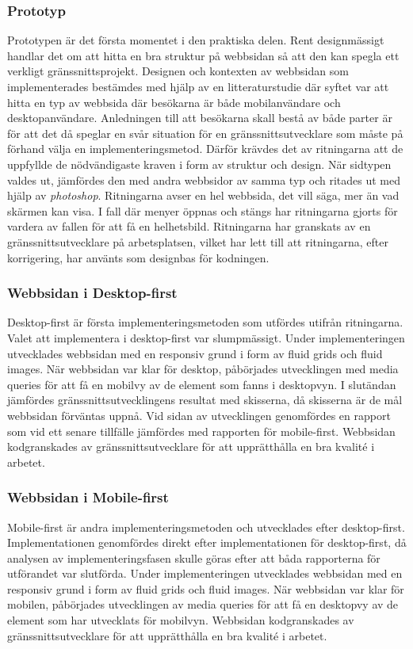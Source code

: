 \documentclass[11pt]{article}
\begin{document}
\subsubsection{Prototyp}
Prototypen är det första momentet i den praktiska delen. Rent designmässigt handlar det om att hitta en bra struktur på webbsidan så att den kan spegla ett verkligt gränssnittsprojekt. Designen och kontexten av webbsidan som implementerades bestämdes med hjälp av en litteraturstudie där syftet var att hitta en typ av webbsida där besökarna är både mobilanvändare och desktopanvändare. Anledningen till att besökarna skall bestå av både parter är för att det då speglar en svår situation för en gränssnittsutvecklare som måste på förhand välja en implementeringsmetod. Därför krävdes det av ritningarna att de uppfyllde de nödvändigaste kraven i form av struktur och design. När sidtypen valdes ut, jämfördes den med andra webbsidor av samma typ och ritades ut med hjälp av \textit{photoshop}. Ritningarna avser en hel webbsida, det vill säga, mer än vad skärmen kan visa. I fall där menyer öppnas och stängs har ritningarna gjorts för vardera av fallen för att få en helhetsbild. Ritningarna har granskats av en gränssnittsutvecklare på arbetsplatsen, vilket har lett till att ritningarna, efter korrigering, har använts som designbas för kodningen.
  
\subsubsection{Webbsidan i Desktop-first}
Desktop-first är första implementeringsmetoden som utfördes utifrån ritningarna. Valet att implementera i desktop-first var slumpmässigt. Under implementeringen utvecklades webbsidan med en responsiv grund i form av fluid grids och fluid images. När webbsidan var klar för desktop, påbörjades utvecklingen med media queries för att få en mobilvy av de element som fanns i desktopvyn. I slutändan jämfördes gränssnittsutvecklingens resultat med skisserna, då skisserna är de mål webbsidan förväntas uppnå. Vid sidan av utvecklingen genomfördes en rapport som vid ett senare tillfälle jämfördes med rapporten för mobile-first. Webbsidan kodgranskades av gränssnittsutvecklare för att upprätthålla en bra kvalité i arbetet.

\subsubsection{Webbsidan i Mobile-first}
Mobile-first är andra implementeringsmetoden och utvecklades efter desktop-first. Implementationen genomfördes direkt efter implementationen för desktop-first, då analysen av implementeringsfasen skulle göras efter att båda rapporterna för utförandet var slutförda. Under implementeringen utvecklades webbsidan med en responsiv grund i form av fluid grids och fluid images. När webbsidan var klar för mobilen, påbörjades utvecklingen av media queries för att få en desktopvy av de element som har utvecklats för mobilvyn. Webbsidan kodgranskades av gränssnittsutvecklare för att upprätthålla en bra kvalité i arbetet.
\end{document}
